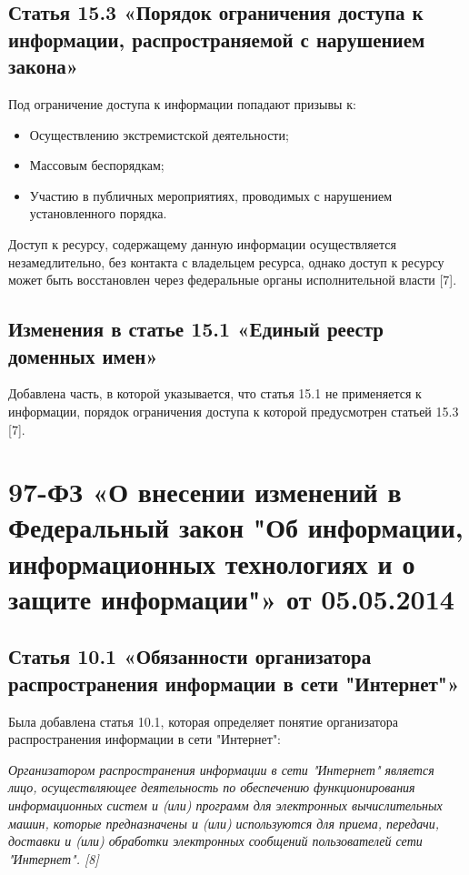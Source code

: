 \documentclass[14pt,a4paper,report]{article}
\begin{document}
\subsection{Статья 15.3 «Порядок ограничения доступа к информации, распространяемой с нарушением закона»}

Под ограничение доступа к информации попадают призывы к:

\begin{itemize}
	\item Осуществлению экстремистской деятельности;
	\item Массовым беспорядкам;
	\item Участию в публичных мероприятиях, проводимых с нарушением установленного порядка.
\end{itemize}

Доступ к ресурсу, содержащему данную информации осуществляется незамедлительно, без контакта с владельцем ресурса, однако доступ к ресурсу может быть восстановлен через федеральные органы исполнительной власти [7].

\subsection{Изменения в статье 15.1 «Единый реестр доменных имен»}

Добавлена часть, в которой указывается, что статья 15.1 не применяется к информации, порядок ограничения доступа к которой предусмотрен статьей 15.3 [7].

\section{97-ФЗ «О внесении изменений в Федеральный закон "Об информации, информационных технологиях и о защите информации"» от 05.05.2014}

\subsection{Статья 10.1 «Обязанности организатора распространения информации в сети "Интернет"»}

Была добавлена статья 10.1, которая определяет понятие организатора распространения информации в сети "Интернет":

\begin{displayquote}
	\emph{Организатором распространения информации в сети "Интернет" является лицо, осуществляющее деятельность по обеспечению функционирования информационных систем и (или) программ для электронных вычислительных машин, которые предназначены и (или) используются для приема, передачи, доставки и (или) обработки электронных сообщений пользователей сети "Интернет". [8]}
\end{displayquote}
\end{document}
